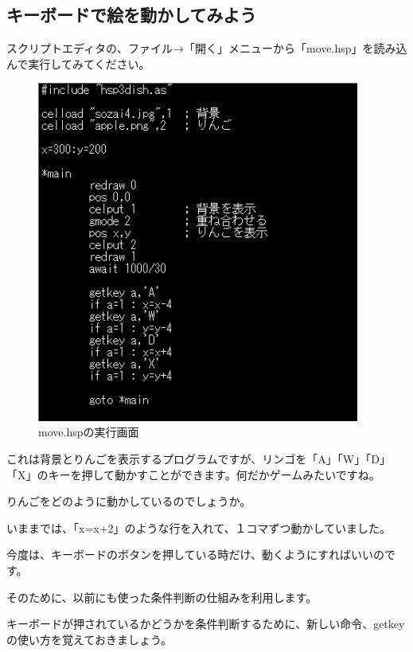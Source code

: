 \newpage
\subsection{キーボードで絵を動かしてみよう}

スクリプトエディタの、ファイル→「開く」メニューから「move.hsp」を読み込んで実行してみてください。


\begin{figure}[H]
    \begin{center}
      \includegraphics[keepaspectratio,width=10.61cm,height=11.229cm]{text04-img/s_move.png}
      \caption{move.hspの実行画面}
    \end{center}
    \label{fig:prog_menu}
\end{figure}

これは背景とりんごを表示するプログラムですが、リンゴを「A」「W」「D」「X」のキーを押して動かすことができます。何だかゲームみたいですね。

りんごをどのように動かしているのでしょうか。

いままでは、「x=x+2」のような行を入れて、１コマずつ動かしていました。

今度は、キーボードのボタンを押している時だけ、動くようにすればいいのです。

そのために、以前にも使った条件判断の仕組みを利用します。

キーボードが押されているかどうかを条件判断するために、新しい命令、getkeyの使い方を覚えておきましょう。

\begin{description}
    \item {}
\end{description}


